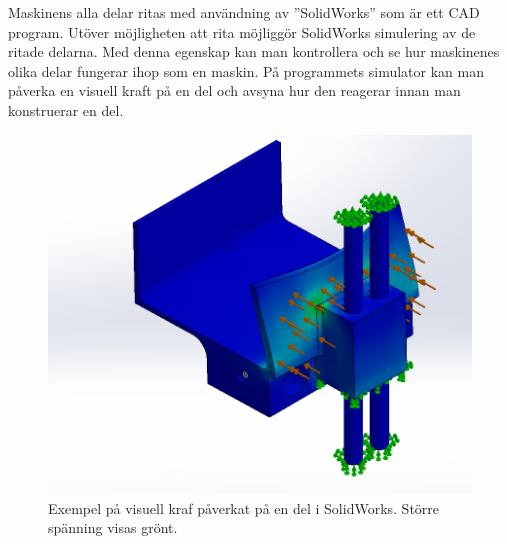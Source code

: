 Maskinens alla delar ritas med användning av ”SolidWorks” som är ett CAD program. Utöver möjligheten att rita möjliggör SolidWorks simulering av de ritade delarna. Med denna egenskap kan man kontrollera och se hur maskinenes olika delar fungerar ihop som en maskin. På programmets simulator kan man påverka en visuell kraft på en del och avsyna hur den reagerar innan man konstruerar en del.
\begin{figure}[ht]
	\begin{center}
		\includegraphics[scale=0.8]{images/hissEdited.png}
		\caption{Exempel på visuell kraf påverkat på en del i SolidWorks. Större spänning visas grönt.}
		\label{simulering}	
	\end{center}
\end{figure}